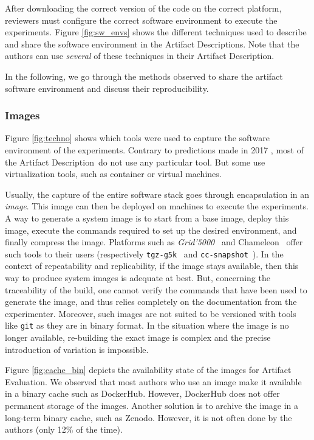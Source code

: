 \documentclass[sigconf,natbib=false]{acmart}
\newcommand{\grid}{\emph{Grid'5000}}
\newcommand{\ad}{Artifact Description}
\newcommand{\aeval}{Artifact Evaluation}
\begin{document}
After downloading the correct version of the code on the correct platform, reviewers must configure the correct software environment to execute the experiments.
Figure \ref{fig:sw_envs} shows the different techniques used to describe and share the software environment in the \ad s.
Note that the authors can use \emph{several} of these techniques in their \ad.

In the following, we go through the methods observed to share the artifact software environment and discuss their reproducibility.

\subsubsection{Images}\label{sec:sop:sw:images}

Figure \ref{fig:techno} shows which tools were used to capture the software environment of the experiments.
Contrary to predictions made in 2017 \cite{silver2017software}, most of the \ad\ do not use any particular tool.
But some use virtualization tools, such as container or virtual machines.

Usually, the capture of the entire software stack goes through encapsulation in an \emph{image}.
This image can then be deployed on machines to execute the experiments.
A way to generate a system image is to start from a base image, deploy this image, execute the commands required to set up the desired environment, and finally compress the image.
Platforms such as \grid\ \cite{grid5000} and Chameleon\ \cite{chameleon} offer such tools to their users (respectively \texttt{tgz-g5k}\ \cite{tgz-g5k} and \texttt{cc-snapshot}\ \cite{cc-snapshot}).
In the context of repeatability and replicability, if the image stays available, then this way to produce system images is adequate at best.
But, concerning the traceability of the build, one cannot verify the commands that have been used to generate the image, and thus relies completely on the documentation from the experimenter.
Moreover, such images are not suited to be versioned with tools like \texttt{git} as they are in binary format.
In the situation where the image is no longer available, re-building the exact image is complex and the precise introduction of variation is impossible.

Figure \ref{fig:cache_bin} depicts the availability state of the images for \aeval.
We observed that most authors who use an image make it available in a binary cache such as DockerHub. 
However, DockerHub does not offer permanent storage of the images.
Another solution is to archive the image in a long-term binary cache, such as Zenodo.
However, it is not often done by the authors (only 12\% of the time).
\end{document}
